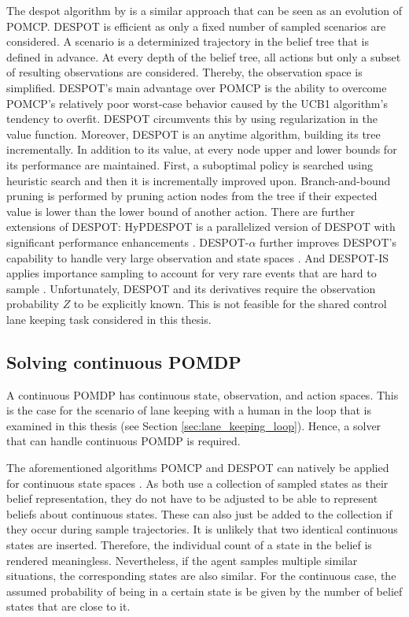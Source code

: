 The \gls{despot} algorithm by \cite{despot} is a similar approach that can be seen as an evolution of POMCP. DESPOT is efficient as only a fixed number of sampled scenarios are considered. A scenario is a determinized trajectory in the belief tree that is defined in advance. At every depth of the belief tree, all actions but only a subset of resulting observations are considered. Thereby, the observation space is simplified. DESPOT's main advantage over POMCP is the ability to overcome POMCP's relatively poor worst-case behavior \parencite{pomcp-worst-case} caused by the UCB1 algorithm's tendency to overfit. DESPOT circumvents this by using regularization in the value function. Moreover, DESPOT is an anytime algorithm, building its tree incrementally. In addition to its value, at every node upper and lower bounds for its performance are maintained. First, a suboptimal policy is searched using heuristic search \parencite{solver_hsvi} and then it is incrementally improved upon. Branch-and-bound pruning is performed by pruning action nodes from the tree if their expected value is lower than the lower bound of another action. There are further extensions of DESPOT: HyPDESPOT is a parallelized version of DESPOT with significant performance enhancements \parencite{hyp-despot}. DESPOT-$\alpha$ further improves DESPOT's capability to handle very large observation and state spaces \parencite{despot-a}. And DESPOT-IS applies importance sampling to account for very rare events that are hard to sample \parencite{despot-is}. Unfortunately, DESPOT and its derivatives require the observation probability $Z$ to be explicitly known. This is not feasible for the shared control lane keeping task considered in this thesis.



\subsection{Solving continuous POMDP}

A continuous POMDP has continuous state, observation, and action spaces. This is the case for the scenario of lane keeping with a human in the loop that is examined in this thesis (see Section \ref{sec:lane_keeping_loop}). Hence, a solver that can handle continuous POMDP is required.

The aforementioned algorithms POMCP and DESPOT can natively be applied for continuous state spaces \parencite{pomcp_continuous}. As both use a collection of sampled states as their belief representation, they do not have to be adjusted to be able to represent beliefs about continuous states. These can also just be added to the collection if they occur during sample trajectories. It is unlikely that two identical continuous states are inserted. Therefore, the individual count of a state in the belief is rendered meaningless. Nevertheless, if the agent samples multiple similar situations, the corresponding states are also similar. For the continuous case, the assumed probability of being in a certain state is be given by the number of belief states that are close to it.

